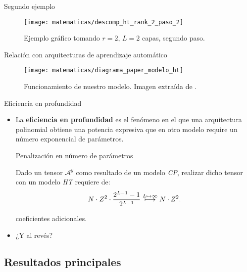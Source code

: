 \begin{frame}{Segundo ejemplo}

	\begin{figure}
		\texttt{[image: matematicas/descomp\_ht\_rank\_2\_paso\_2]}
		\caption{Ejemplo gráfico tomando $r = 2$, $L = 2$ capas, segundo paso.}
	\end{figure}

\end{frame}

\begin{frame}{Relación con arquitecturas de aprendizaje automático}

	\begin{figure}
		\centering
		\texttt{[image: matematicas/diagrama\_paper\_modelo\_ht]}
		\caption{Funcionamiento de nuestro modelo. Imagen extraída de \cite{matematicas:principal}.}
	\end{figure}


\end{frame}

\begin{frame}{Eficiencia en profundidad}
	\begin{itemize}
		\item La \textbf{eficiencia en profundidad} es el fenómeno en el que una arquitectura polinomial obtiene una potencia expresiva que en otro modelo require un número exponencial de parámetros.
		      \begin{block}{Penalización en número de parámetros}

			      Dado un tensor $\mathcal{A}^y$ como resultado de un modelo \textit{CP}, realizar dicho tensor con un modelo \textit{HT} requiere de:
			      \begin{equation}
				      N \cdot Z^2 \cdot \frac{2^{L-1} - 1}{2^{L-1}} \stackrel{L \mapsto \infty}{\longmapsto} N \cdot Z^2.
			      \end{equation}

			      coeficientes adicionales.
		      \end{block}

		\item ¿Y al revés?
	\end{itemize}
\end{frame}

\subsection{Resultados principales}

